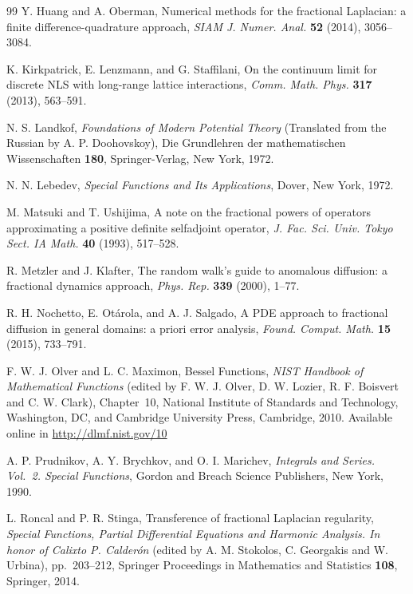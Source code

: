 \documentclass[a4paper,11pt,reqno]{amsart}
\theoremstyle{definition}
\numberwithin{equation}{section}
\begin{document}
\begin{thebibliography}{99}
Y. Huang and A. Oberman,
{Numerical methods for the fractional Laplacian: a finite difference-quadrature approach},
\textit{SIAM J. Numer. Anal.} \textbf{52} (2014), 3056--3084.

K. Kirkpatrick, E. Lenzmann, and G. Staffilani,
{On the continuum limit for discrete NLS with long-range lattice interactions},
\textit{Comm. Math. Phys.}
\textbf{317} (2013), 563--591.

N. S. Landkof,
\textit{Foundations of Modern Potential Theory}
(Translated from the Russian by A. P. Doohovskoy),
Die Grundlehren der mathematischen Wissenschaften \textbf{180},
Springer-Verlag, New York, 1972.

N. N. Lebedev,
\textit{Special Functions and Its Applications},
Dover, New York, 1972.

M. Matsuki and T. Ushijima,
{A note on the fractional powers of operators approximating a positive definite selfadjoint operator},
\textit{J. Fac. Sci. Univ. Tokyo Sect. IA Math.}
\textbf{40} (1993), 517--528.

R. Metzler and J. Klafter,
{The random walk's guide to anomalous diffusion: a fractional dynamics approach},
\textit{Phys. Rep.}
\textbf{339} (2000), 1--77.

R. H. Nochetto, E. Ot\'arola, and A. J. Salgado,
{A PDE approach to fractional diffusion in general domains: a priori error analysis},
\textit{Found. Comput. Math.}
\textbf{15} (2015), 733--791.

F. W. J. Olver and L. C. Maximon,
Bessel Functions,
\textit{NIST Handbook of Mathematical Functions}
(edited by F. W. J. Olver, D. W. Lozier, R. F. Boisvert and C. W. Clark),
Chapter~10, National Institute of Standards and Technology, Washington, DC,
and Cambridge University Press, Cambridge, 2010.
Available online in \url{http://dlmf.nist.gov/10}

A. P. Prudnikov, A. Y. Brychkov, and O. I. Marichev,
\textit{Integrals and Series. Vol.~2. Special Functions},
Gordon and Breach Science Publishers, New York, 1990.

L. Roncal and P. R. Stinga,
{Transference of fractional Laplacian regularity},
\textit{Special Functions, Partial Differential Equations and Harmonic Analysis. In honor of Calixto P. Calder\'on}
(edited by A. M. Stokolos, C. Georgakis and W. Urbina), pp.~203--212,
Springer Proceedings in Mathematics and Statistics \textbf{108}, Springer, 2014.


\end{thebibliography}
\end{document}
